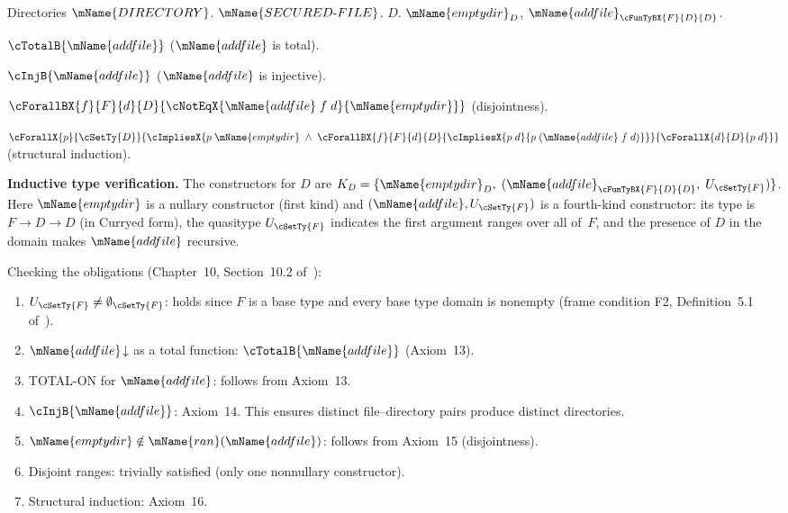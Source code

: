 \documentclass[11pt]{article}
\newcommand{\SECFILE}{\mName{SECURED\text{-}FILE}}
\newcommand{\DIR}{\mName{DIRECTORY}}
\begin{document}
\begin{theory-ext}
{Directories}
{$\DIR$.}
{$\SECFILE$.}
{$D$.}
{$\mName{emptydir}_D$,\;
 $\mName{addfile}_{\cFunTyBX{F}{D}{D}}$.}
{
\be \setcounter{enumi}{12}
\item $\cTotalB{\mName{addfile}}$
      \hfill ($\mName{addfile}$ is total).

\item $\cInjB{\mName{addfile}}$
      \hfill ($\mName{addfile}$ is injective).

\item $\cForallBX{f}{F}{d}{D}{
      \cNotEqX{\mName{addfile}\;f\;d}{\mName{emptydir}}}$
      \hfill (disjointness).

\item $\cForallX{p}{\cSetTy{D}}{
      \cImpliesX{p\;\mName{emptydir} \;\wedge\;
        \cForallBX{f}{F}{d}{D}{
          \cImpliesX{p\;d}{p\;(\mName{addfile}\;f\;d)}}}{
        \cForallX{d}{D}{p\;d}}}$
      \hfill (structural induction).
\ee
}
\end{theory-ext}

\medskip
\noindent\textbf{Inductive type verification.}
The constructors for $D$ are
$K_D = \{\mName{emptydir}_D,\;
  (\mName{addfile}_{\cFunTyBX{F}{D}{D}},\; U_{\cSetTy{F}})\}$.
Here $\mName{emptydir}$ is a nullary constructor (first kind) and
$(\mName{addfile}, U_{\cSetTy{F}})$ is a fourth-kind constructor:
its type is $F \to D \to D$ (in Curryed form), the quasitype
$U_{\cSetTy{F}}$ indicates the first argument ranges over all
of~$F$, and the presence of $D$ in the domain makes
$\mName{addfile}$ recursive.

Checking the obligations (Chapter~10, Section~10.2
of~\cite{farmer2025}):
\begin{enumerate}[label=(\alph*)]
  \item $U_{\cSetTy{F}} \ne \emptyset_{\cSetTy{F}}$: holds since
    $F$ is a base type and every base type domain is nonempty
    (frame condition F2, Definition~5.1 of~\cite{farmer2025}).
  \item $\mName{addfile}\!\downarrow$ as a total function:
    $\cTotalB{\mName{addfile}}$ (Axiom~13).
  \item TOTAL-ON for $\mName{addfile}$: follows from Axiom~13.
  \item $\cInjB{\mName{addfile}}$: Axiom~14.  This ensures
    distinct file--directory pairs produce distinct directories.
  \item $\mName{emptydir} \notin \mName{ran}(\mName{addfile})$:
    follows from Axiom~15 (disjointness).
  \item Disjoint ranges: trivially satisfied (only one nonnullary
    constructor).
  \item Structural induction: Axiom~16.
\end{enumerate}
\end{document}
